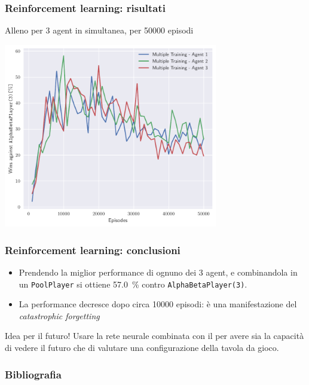\documentclass[handout]{beamer}
\newcommand{\ipy}[1]{\texttt{#1}}
\begin{document}
  \begin{frame}
    \frametitle{Reinforcement learning: risultati}
    Alleno per 3 agent in simultanea, per \num{50000} episodi
    \begin{center}
      \includegraphics[width=0.7\textwidth]{img/reinforcement-50k.pdf}
    \end{center}
    
  \end{frame}

  \begin{frame}
    \frametitle{Reinforcement learning: conclusioni}
    \begin{itemize}
      \item Prendendo la miglior performance di ognuno dei 3 agent, e combinandola in un \ipy{PoolPlayer} si ottiene \SI{57.0}{\percent} contro \ipy{AlphaBetaPlayer(3)}.
      \item La performance decresce dopo circa \num{10000} episodi: è una manifestazione del \emph{catastrophic forgetting}\cite{kirkpatrick2017overcoming}
    \end{itemize}
  
    \pause
    \begin{exampleblock}{Idea per il futuro!}
      Usare la rete neurale combinata con il  per avere sia la capacità di vedere il futuro che di valutare una configurazione della tavola da gioco.
    \end{exampleblock}
  \end{frame}
  


  \begin{frame}[noframenumbering]
    \frametitle{Bibliografia}
    \printbibliography
  \end{frame}
  
\end{document}
